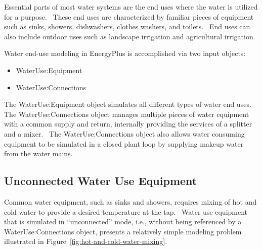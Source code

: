 Essential parts of most water systems are the end uses where the water is utilized for a purpose.~ These end uses are characterized by familiar pieces of equipment such as sinks, showers, dishwashers, clothes washers, and toilets.~ End uses can also include outdoor uses such as landscape irrigation and agricultural irrigation.

Water end-use modeling in EnergyPlus is accomplished via two input objects:

\begin{itemize}
\item WaterUse:Equipment
\item WaterUse:Connections
\end{itemize}

The WaterUse:Equipment object simulates all different types of water end uses.~ The WaterUse:Connections object manages multiple pieces of water equipment with a common supply and return, internally providing the services of a splitter and a mixer.~ The WaterUse:Connections object also allows water consuming equipment to be simulated in a closed plant loop by supplying makeup water from the water mains.

\subsection{Unconnected Water Use Equipment}\label{unconnected-water-use-equipment}

Common water equipment, such as sinks and showers, requires mixing of hot and cold water to provide a desired temperature at the tap.~ Water use equipment that is simulated in ``unconnected'' mode, i.e., without being referenced by a WaterUse:Connections object, presents a relatively simple modeling problem illustrated in Figure~\ref{fig:hot-and-cold-water-mixing}.

